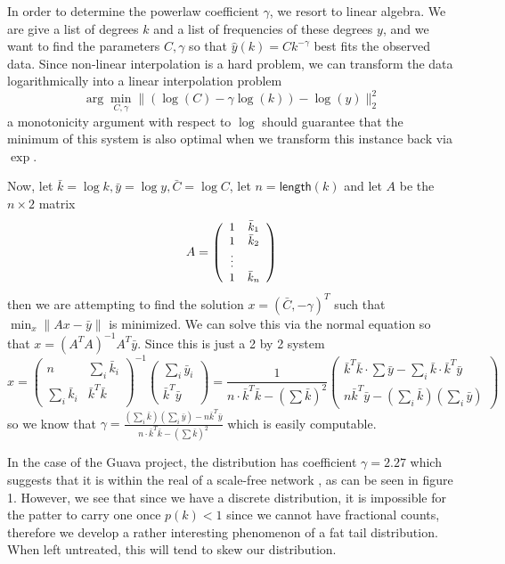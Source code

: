 \documentclass[11pt,a4paper]{article}
\newcommand{\pa}[1]{\left(#1\right)}
\newcommand{\g}[1]{\textsf{#1}}
\newcommand{\arr}[1]{\begin{array}{cccccccccc} #1\end{array}}
\newcommand{\mat}[1]{\left(\arr{#1}\right)}
\begin{document}
In order to determine the powerlaw coefficient $\gamma$, we resort to linear
algebra. We are give a list of degrees $k$ and a list of frequencies of these 
degrees $y$, and we want to find the parameters $C,\gamma$ so that 
$\hat y(k) = Ck^{-\gamma}$ best fits the observed data. Since non-linear 
interpolation is a hard problem, we can transform the data logarithmically into
a linear interpolation problem
$$
\arg\min_{C,\gamma} \|(\log(C) - \gamma \log(k)) - \log(y)\|_2^2
$$
a monotonicity argument with respect to $\log$ should guarantee that the
minimum of this system is also optimal when we transform this instance back
via $\exp$.

Now, let $\bar k = \log k, \bar y = \log y, \bar C = \log C$, let $n = \g{length}(k)$
 and let $A$ be the $n \times 2$ matrix 
 $$\small A = \mat{1 & \bar k_1 \\ 1 & \bar k_2 \\ \vdots \\ 1 & \bar k_n}$$ 
then we are attempting to find the solution $x = \pa{\bar C, -\gamma}^T$ such 
that $\min_x \|Ax - \bar y\|$ is minimized. We can solve this via the normal equation 
\cite{linalg} so that  $x = (A^TA)^{-1}A^T\bar y$. Since this is just a 2 by 2 system
$$
x = \mat{n & \sum_i \bar k_i \\ \sum_i \bar k_i & \bar k^T\bar k}^{-1} 
\mat{\sum_i \bar y_i \\ \bar k^T\bar y} 
= \frac{1}{n\cdot \bar k^T\bar k - \pa{\sum \bar k}^2} 
\mat{\bar k^T \bar k \cdot \sum \bar y - \sum_i \bar k \cdot \bar k^T\bar y \\ 
n \bar k^T \bar y - \pa{\sum_i \bar k}\pa{\sum_i \bar y}}
$$
so we know that $\gamma = 
\frac{\pa{\sum_i \bar k}\pa{\sum_i \bar y}- 
n \bar k^T \bar y}{n\cdot \bar k^T\bar k - \pa{\sum \bar k}^2}$ which is easily
computable. 

In the case of the Guava project, the distribution has coefficient $\gamma = 2.27$
which suggests that it is within the real of a scale-free network \cite{CLASS}, 
as can be seen in 
figure 1. However, we see that since we have a discrete distribution, it is impossible
for the patter to carry one once $p(k) < 1$ since we cannot have fractional counts,
therefore we develop a rather interesting phenomenon of a fat tail distribution.
When left untreated, this will tend to skew our distribution.
\end{document}
